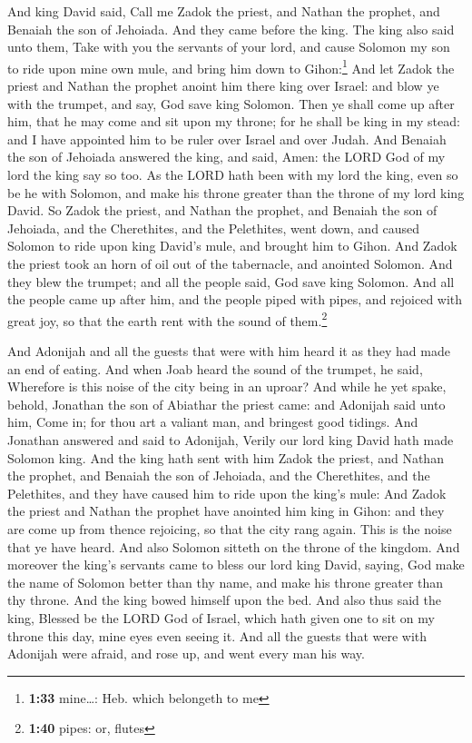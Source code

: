  And king David said, Call me Zadok the priest, and
Nathan the prophet, and Benaiah the son of Jehoiada. And they came
before the king.  The king also said unto them, Take with
you the servants of your lord, and cause Solomon my son to ride upon
mine own mule, and bring him down to Gihon:\footnote{\textbf{1:33}
  mine\ldots: Heb. which belongeth to me}  And let Zadok
the priest and Nathan the prophet anoint him there king over Israel: and
blow ye with the trumpet, and say, God save king Solomon.
 Then ye shall come up after him, that he may come and
sit upon my throne; for he shall be king in my stead: and I have
appointed him to be ruler over Israel and over Judah. 
And Benaiah the son of Jehoiada answered the king, and said, Amen: the
LORD God of my lord the king say so too.  As the LORD
hath been with my lord the king, even so be he with Solomon, and make
his throne greater than the throne of my lord king David.
 So Zadok the priest, and Nathan the prophet, and Benaiah
the son of Jehoiada, and the Cherethites, and the Pelethites, went down,
and caused Solomon to ride upon king David's mule, and brought him to
Gihon.  And Zadok the priest took an horn of oil out of
the tabernacle, and anointed Solomon. And they blew the trumpet; and all
the people said, God save king Solomon.  And all the
people came up after him, and the people piped with pipes, and rejoiced
with great joy, so that the earth rent with the sound of
them.\footnote{\textbf{1:40} pipes: or, flutes}

 And Adonijah and all the guests that were with him heard
it as they had made an end of eating. And when Joab heard the sound of
the trumpet, he said, Wherefore is this noise of the city being in an
uproar?  And while he yet spake, behold, Jonathan the son
of Abiathar the priest came: and Adonijah said unto him, Come in; for
thou art a valiant man, and bringest good tidings.  And
Jonathan answered and said to Adonijah, Verily our lord king David hath
made Solomon king.  And the king hath sent with him Zadok
the priest, and Nathan the prophet, and Benaiah the son of Jehoiada, and
the Cherethites, and the Pelethites, and they have caused him to ride
upon the king's mule:  And Zadok the priest and Nathan
the prophet have anointed him king in Gihon: and they are come up from
thence rejoicing, so that the city rang again. This is the noise that ye
have heard.  And also Solomon sitteth on the throne of
the kingdom.  And moreover the king's servants came to
bless our lord king David, saying, God make the name of Solomon better
than thy name, and make his throne greater than thy throne. And the king
bowed himself upon the bed.  And also thus said the king,
Blessed be the LORD God of Israel, which hath given one to sit on my
throne this day, mine eyes even seeing it.  And all the
guests that were with Adonijah were afraid, and rose up, and went every
man his way.


